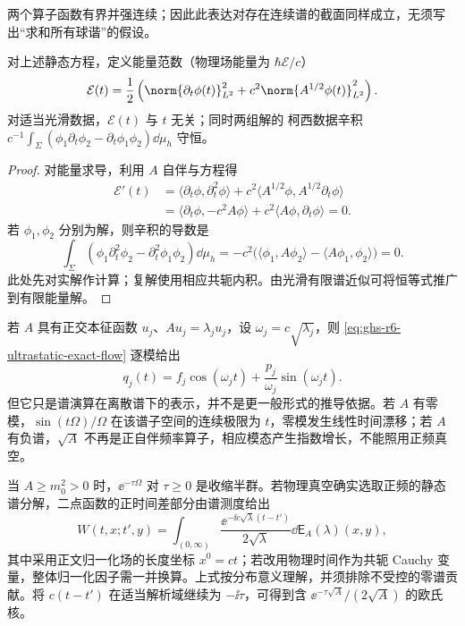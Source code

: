 两个算子函数有界并强连续；因此此表达对存在连续谱的截面同样成立，无须写出“求和所有球谐”的假设。

\begin{proposition}[有限能量及辛量的守恒]
对上述静态方程，定义能量范数（物理场能量为 $\hbar\mathcal E/c$）
\begin{equation}\label{eq:ghs-r6-ultrastatic-energy}
\mathcal E(t)=\frac12\left(\norm{\partial_t\phi(t)}_{L^2}^2
+c^2\norm{A^{1/2}\phi(t)}_{L^2}^2\right).
\end{equation}
对适当光滑数据，$\mathcal E(t)$ 与 $t$ 无关；同时两组解的 柯西数据辛积
$c^{-1}\int_\Sigma(\phi_1\partial_t\phi_2-\partial_t\phi_1\phi_2)\dd\mu_h$ 守恒。
\end{proposition}
\begin{proof}
对能量求导，利用 $A$ 自伴与方程得
\begin{align*}
\mathcal E'(t)
&=\langle\partial_t\phi,\partial_t^2\phi\rangle
+c^2\langle A^{1/2}\phi,A^{1/2}\partial_t\phi\rangle\\
&=\langle\partial_t\phi,-c^2A\phi\rangle
+c^2\langle A\phi,\partial_t\phi\rangle=0.
\end{align*}
若 $\phi_1,\phi_2$ 分别为解，则辛积的导数是
\[
\int_\Sigma(\phi_1\partial_t^2\phi_2-\partial_t^2\phi_1\phi_2)\dd\mu_h
=-c^2\bigl(\langle\phi_1,A\phi_2\rangle-\langle A\phi_1,\phi_2\rangle\bigr)=0.
\]
此处先对实解作计算；复解使用相应共轭内积。由光滑有限谱近似可将恒等式推广到有限能量解。
\end{proof}

若 $A$ 具有正交本征函数 $u_j$、$Au_j=\lambda_ju_j$，设 $\omega_j=c\sqrt{\lambda_j}$，则 \cref{eq:ghs-r6-ultrastatic-exact-flow} 逐模给出
\[
q_j(t)=f_j\cos(\omega_jt)+\frac{p_j}{\omega_j}\sin(\omega_jt).
\]
但它只是谱演算在离散谱下的表示，并不是更一般形式的推导依据。若 $A$ 有零模，$\sin(t\Omega)/\Omega$ 在该谱子空间的连续极限为 $t$，零模发生线性时间漂移；若 $A$ 有负谱，$\sqrt A$ 不再是正自伴频率算子，相应模态产生指数增长，不能照用正频真空。


当 $A\ge m_0^2>0$ 时，$\ee^{-\tau\Omega}$ 对 $\tau\ge0$ 是收缩半群。若物理真空确实选取正频的静态谱分解，二点函数的正时间差部分由谱测度给出
\begin{equation}\label{eq:ghs-r6-ultrastatic-twopoint}
W(t,x;t',y)=\int_{(0,\infty)}
\frac{\ee^{-\ii c\sqrt\lambda(t-t')}}{2\sqrt\lambda}
\dd\mathsf E_A(\lambda)(x,y),
\end{equation}
其中采用正文归一化场的长度坐标 $x^0=ct$；若改用物理时间作为共轭 Cauchy 变量，整体归一化因子需一并换算。上式按分布意义理解，并须排除不受控的零谱贡献。将 $c(t-t')$ 在适当解析域继续为 $-\ii\tau$，可得到含 $\ee^{-\tau\sqrt A}/(2\sqrt A)$ 的欧氏核。

